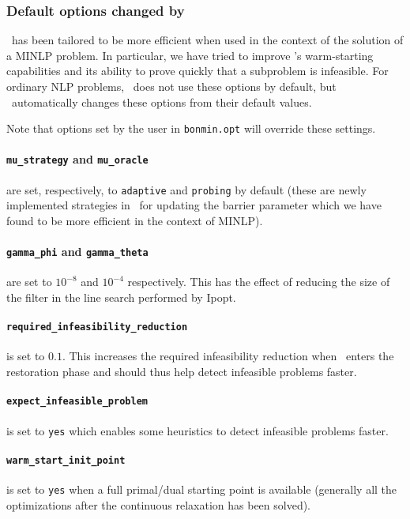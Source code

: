 \subsubsection{Default options changed by \Bonmin}
\Ipopt\ has been tailored to be more efficient when used in the context of the
solution of a MINLP problem. In particular, we have tried to
improve \Ipopt's warm-starting capabilities and its ability to prove quickly that a subproblem
is infeasible. For ordinary NLP problems, \Ipopt\ does not use these options
by default, but \Bonmin\ automatically changes these options from their default values.

Note that options set by the user in {\tt bonmin.opt} will override these
settings.

\paragraph{{\tt mu\_strategy} and {\tt mu\_oracle}} are set, respectively, to
{\tt adaptive} and {\tt probing} by default (these are newly implemented strategies in \Ipopt\
for updating the barrier parameter \cite{NocedalAdaptive} which we have found to be
more efficient in the context of MINLP).
\paragraph{{\tt gamma\_phi} and {\tt gamma\_theta}} are set to $10^{-8}$ and $10^{-4}$
respectively. This has the effect of reducing the size of the filter in the line search performed by Ipopt.

\paragraph{\tt required\_infeasibility\_reduction} is set to $0.1$.
This increases the required infeasibility reduction when \Ipopt\ enters the
restoration phase and should thus help
detect infeasible problems faster.

\paragraph{\tt expect\_infeasible\_problem} is set to {\tt yes} which enables some heuristics
to detect infeasible problems faster.

\paragraph{\tt warm\_start\_init\_point} is set to {\tt yes} when a full primal/dual starting
point is available (generally all the optimizations after the continuous relaxation has been solved).

